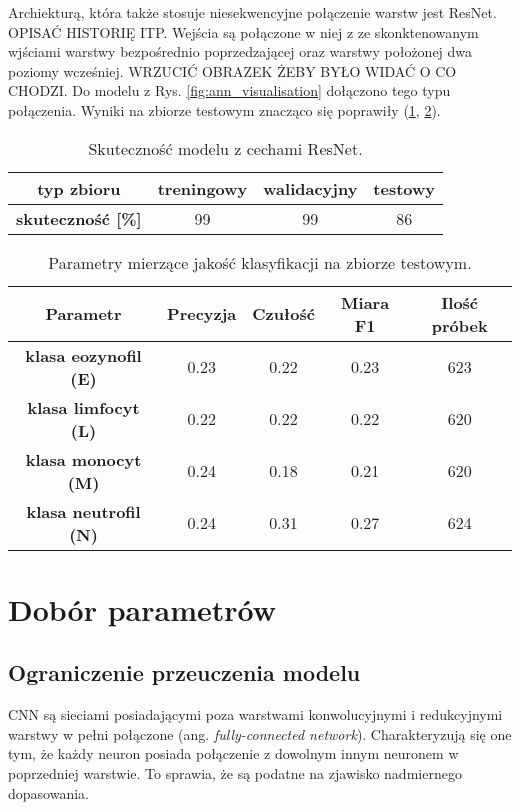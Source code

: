 {%
Archiekturą, która także stosuje niesekwencyjne połączenie warstw jest ResNet. OPISAĆ HISTORIĘ ITP. Wejścia są połączone w niej z ze skonktenowanym wjściami warstwy bezpośrednio poprzedzającej oraz warstwy położonej dwa poziomy wcześniej. WRZUCIĆ OBRAZEK ŻEBY BYŁO WIDAĆ O CO CHODZI. Do modelu z Rys. \ref{fig:ann_visualisation} dołączono tego typu połączenia. Wyniki na zbiorze testowym znacząco się poprawiły (\ref{tab:ResNet_1_acc}, \ref{tab:ResNet_1_params_val}).

 \begin{table}[h!]
\centering
\caption[Short Heading]{Skuteczność modelu z cechami ResNet.}
\label{tab:ResNet_1_acc}
\begin{tabular}{|c|c|c|c|}
\hline
\textbf{typ zbioru}           & \textbf{treningowy} & \textbf{walidacyjny} & \textbf{testowy} \\ \hline
\textbf{skuteczność {[}\%{]}} & 99                  & 99                   & 86               \\ \hline
\end{tabular}
\end{table}

\begin{table}[h!]
\centering
\caption[Short Heading]{Parametry mierzące jakość klasyfikacji na zbiorze testowym.}
\label{tab:ResNet_1_params_val}
\begin{tabular}{|c|c|c|c|c|}
\hline
\textbf{Parametr}                               & \textbf{Precyzja} & \textbf{Czułość} & \textbf{Miara F1} & \textbf{Ilość próbek} \\ \hline
\textbf{klasa eozynofil (E)} & 0.23   & 0.22   & 0.23 & 623  \\ \hline
\textbf{klasa limfocyt (L)} & 0.22  & 0.22 & 0.22  & 620  \\ \hline
\textbf{klasa monocyt (M)} & 0.24   & 0.18    & 0.21  & 620  \\ \hline
\textbf{klasa neutrofil (N)} & 0.24   & 0.31    & 0.27  & 624  \\ \hline
\end{tabular}
\end{table}

}
\section{Dobór parametrów}
\label{dobor_parametrow}

\subsection{Ograniczenie przeuczenia modelu}
CNN są sieciami posiadającymi poza warstwami konwolucyjnymi i redukcyjnymi warstwy w pełni połączone (ang. \textit{fully-connected network}). Charakteryzują się one tym, że każdy neuron posiada połączenie z dowolnym innym neuronem w poprzedniej warstwie. To sprawia, że są podatne na zjawisko nadmiernego dopasowania. 
